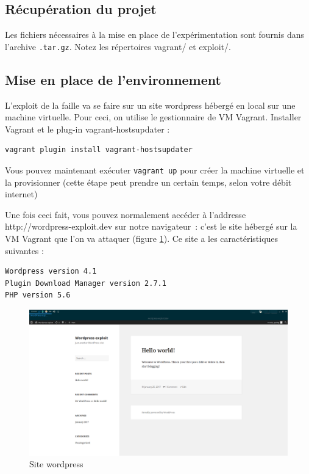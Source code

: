 \documentclass[a4paper,oneside,10pt]{article}
\begin{document}
\subsection{Récupération du projet}
Les fichiers nécessaires à la mise en place de l’expérimentation sont fournis dans l'archive \texttt{.tar.gz}. Notez les répertoires vagrant/ et exploit/.
 
\subsection{Mise en place de l’environnement}
L’exploit de la faille va se faire sur un site wordpress hébergé en local sur une machine virtuelle. Pour ceci, on utilise le gestionnaire de VM Vagrant. Installer Vagrant et le plug-in vagrant-hostsupdater :
\begin{verbatim}
vagrant plugin install vagrant-hostsupdater
\end{verbatim}

Vous pouvez maintenant exécuter \texttt{vagrant up} pour créer la machine virtuelle et la provisionner (cette étape peut prendre un certain temps, selon votre débit internet)

Une fois ceci fait, vous pouvez normalement accéder à l’addresse http://wordpress-exploit.dev sur notre navigateur~: c’est le site hébergé sur la VM Vagrant que l’on va attaquer (figure \ref{hello_world}). Ce site a les caractéristiques suivantes : 
\begin{verbatim}
Wordpress version 4.1
Plugin Download Manager version 2.7.1
PHP version 5.6
\end{verbatim}

\begin{figure}[ht]
\centering
\includegraphics[width=\textwidth]{img/hello_world.png}
\caption{Site wordpress}
\label{hello_world}
\end{figure} 
\end{document}
